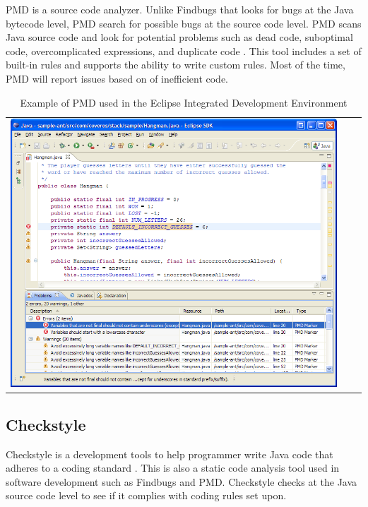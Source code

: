 PMD is a source code analyzer. Unlike Findbugs that looks for bugs at the Java bytecode level, PMD search for possible bugs at the source code level. PMD scans Java source code and look for potential problems such as  dead code, suboptimal code, overcomplicated expressions, and duplicate code \cite{BugFindingTools}. This tool includes a set of built-in rules and supports the ability to write custom rules. Most of the time, PMD will report issues based on of inefficient code. 
\begin{table}[htbp]
\begin{tabular}{|c||c|c|}
\hline
\centering
\includegraphics[scale=0.45]{eclipse-pmdmarkers.png}
\end{tabular}
\caption{Example of PMD used in the Eclipse Integrated Development Environment}
\label{tab:PMD}
\end{table}

\newpage

\subsection{Checkstyle}

Checkstyle is a development tools to help programmer write Java code that adheres to a coding standard \cite{Merson:2013:UAE:2508075.2508433}. This is also a static code analysis tool used in software development such as Findbugs and PMD. Checkstyle checks at the Java source code level to see if it complies with coding rules set upon. 

